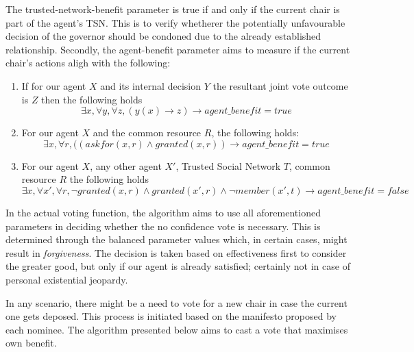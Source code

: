 The trusted-network-benefit parameter is true if and only if the current chair is part of the agent's TSN. This is to verify whetherer the potentially unfavourable decision of the governor should be condoned due to the already established relationship. Secondly, the agent-benefit parameter aims to measure if the current chair's actions aligh with the following:

\begin{enumerate}
    \item If for our agent $X$ and its internal decision $Y$ the resultant joint vote outcome is $Z$ then the following holds
    \begin{equation}
        \exists x, \forall y, \forall z, (y(x) \rightarrow z) \rightarrow agent\_benefit = true
    \end{equation}
    
    \item For our agent $X$ and the common resource $R$, the following holds:
    \begin{equation}
        \exists x, \forall r, ((askfor(x,r) \land granted(x,r)) \rightarrow agent\_benefit = true
    \end{equation}
    \item For our agent $X$, any other agent $X'$, Trusted Social Network $T$, common resource $R$ the following holds
    \begin{equation}
        \exists x, \forall x', \forall r, \neg granted(x,r) \land granted(x',r) \land \neg member(x',t) \rightarrow agent\_benefit = false
    \end{equation}
\end{enumerate}

In the actual voting function, the algorithm aims to use all aforementioned parameters in deciding whether the no confidence vote is necessary. This is determined through the balanced parameter values which, in certain cases, might result in \textit{forgiveness}. The decision is taken based on effectiveness first to consider the greater good, but only if our agent is already satisfied; certainly not in case of personal existential jeopardy.

In any scenario, there might be a need to vote for a new chair in case the current one gets deposed. This process is initiated based on the manifesto proposed by each nominee. The algorithm presented below aims to cast a vote that maximises own benefit.



